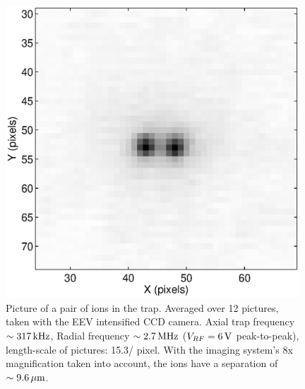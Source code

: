 \begin{figure}[!ht]
\centering
\includegraphics[width=11cm]{chapter6/twinion/twinionpic}
\caption[Picture of a pair of ions in the trap]{Picture of a pair of ions in the trap. Averaged over 12 pictures, taken with the EEV intensified CCD camera. Axial trap frequency $\sim 317\,\mbox{kHz}$, Radial frequency $\sim 2.7\,\mbox{MHz}$ ($V_{RF} = 6\,\mbox{V}$ peak-to-peak), length-scale of pictures: 15.3\um / pixel. With the imaging system's 8x magnification taken into account, the ions have a separation of $\sim 9.6 \,\mbox{$\mu$m}$.}
\label{fig:pairions}
\end{figure} 



